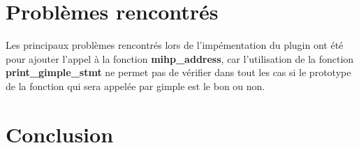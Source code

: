 \documentclass[12pt,french]{article}
\begin{document}
\section{\color{blue}Problèmes rencontrés}

Les principaux problèmes rencontrés lors de l'impémentation du plugin ont été pour ajouter l'appel à la fonction \textbf{mihp\_address}, car l'utilisation de la fonction \textbf{print\_gimple\_stmt} ne permet pas de vérifier dans tout les cas si le prototype de la fonction qui sera appelée par gimple est le bon ou non.

\section{\color{blue}Conclusion}
\end{document}
